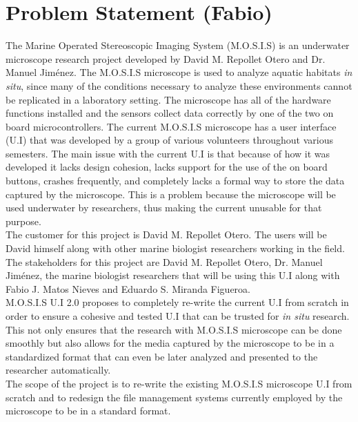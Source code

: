  \section{Problem Statement (Fabio)}
 The Marine Operated Stereoscopic Imaging System (M.O.S.I.S) is an underwater microscope research project developed by David M. Repollet Otero and Dr. Manuel Jiménez. The M.O.S.I.S microscope is used to analyze aquatic habitats \textit{in situ}, since many of the conditions necessary to analyze these environments cannot be replicated in a laboratory setting. The microscope has all of the hardware functions installed and the sensors collect data correctly by one of the two on board microcontrollers. The current M.O.S.I.S microscope has a user interface (U.I) that was developed by a group of various volunteers throughout various semesters. The main issue with the current U.I is that because of how it was developed it lacks design cohesion, lacks support for the use of the on board buttons, crashes frequently, and completely lacks a formal way to store the data captured by the microscope. This is a problem because the microscope will be used underwater by researchers, thus making the current unusable for that purpose.\\
 The customer for this project is David M. Repollet Otero. The users will be David himself along with other marine biologist researchers working in the field. The stakeholders for this project are David M. Repollet Otero, Dr. Manuel Jiménez, the marine biologist researchers that will be using this U.I along with Fabio J. Matos Nieves and Eduardo S. Miranda Figueroa.\\
 M.O.S.I.S U.I 2.0 proposes to completely re-write the current U.I from scratch in order to ensure a cohesive and tested U.I that can be trusted for \textit{in situ} research. This not only ensures that the research with M.O.S.I.S microscope can be done smoothly but also allows for the media captured by the microscope to be in a standardized format that can even be later analyzed and presented to the researcher automatically.\\
The scope of the project is to re-write the existing M.O.S.I.S microscope U.I from scratch and to redesign the file management systems currently employed by the microscope to be in a standard format.